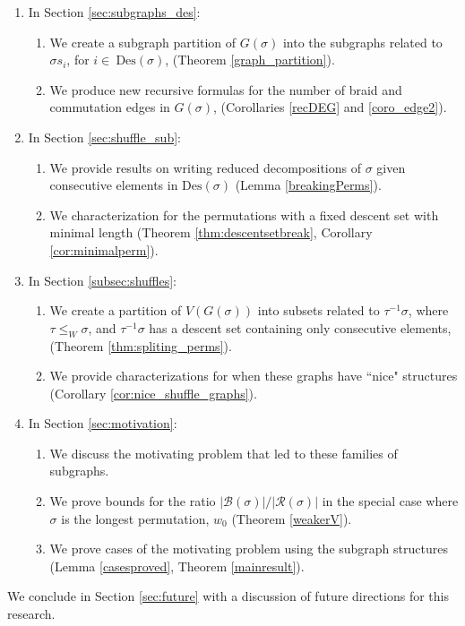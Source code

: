 \documentclass[11pt,reqno]{amsart}
\theoremstyle{definition}
\theoremstyle{notation}
\newcommand{\Des}{\text{Des}}
\newcommand{\calR}{\mathcal{R}}
\newcommand{\calB}{\mathcal{B}}
\begin{document}
\begin{enumerate}
    \item In Section \ref{sec:subgraphs_des}:
    \begin{enumerate}
        \item We create a subgraph partition of $G(\sigma)$ into the subgraphs related to $\sigma s_i$, for $i\in~\Des(\sigma)$, (Theorem \ref{graph_partition}).
        \item We produce new recursive formulas for the number of braid and commutation edges in $G(\sigma)$, (Corollaries \ref{recDEG} and \ref{coro_edge2}).
    \end{enumerate}
    \item In Section \ref{sec:shuffle_sub}:
    \begin{enumerate}
        \item We provide results on writing reduced decompositions of $\sigma$ given consecutive elements in $\Des(\sigma)$ (Lemma \ref{breakingPerms}).
        \item We characterization for the permutations with a fixed descent set with minimal length (Theorem \ref{thm:descentsetbreak}, Corollary \ref{cor:minimalperm}).
    \end{enumerate}
    \item In Section \ref{subsec:shuffles}:
    \begin{enumerate}
        \item We create a partition of $V(G(\sigma))$ into subsets related to $\tau^{-1}\sigma$, where $\tau \leq_W \sigma$, and $\tau^{-1}\sigma$ has a descent set containing only consecutive elements, (Theorem \ref{thm:spliting_perms}).
        \item We provide characterizations for when these graphs have ``nice" structures (Corollary \ref{cor:nice_shuffle_graphs}).
    \end{enumerate}
    \item In Section \ref{sec:motivation}:
    \begin{enumerate}
    \item We discuss the motivating problem that led to these families of subgraphs.
    \item We prove bounds for the ratio $|\calB(\sigma)|/|\calR(\sigma)|$ in the special case where $\sigma$ is the longest permutation, $w_0$ (Theorem \ref{weakerV}).
        \item We prove cases of the motivating problem using the subgraph structures (Lemma \ref{casesproved}, Theorem \ref{mainresult}).
    \end{enumerate}
\end{enumerate}
We conclude in Section \ref{sec:future} with a discussion of future directions for this research.
\end{document}
